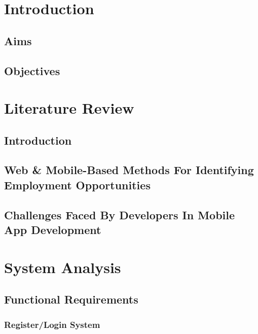 \chapter{Introduction}



\section{Aims }


\section{Objectives}





\chapter{Literature Review}

\section{Introduction}



\section{Web \& Mobile-Based Methods For Identifying Employment Opportunities}


\section{Challenges Faced By Developers In Mobile App Development}
\chapter{System Analysis}

\section{Functional Requirements}


\subsection{Register/Login System}

